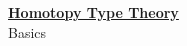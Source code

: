 \documentclass[hott-all.tex]{subfiles}
\begin{document}
\begin{center}
  {\Large{\underline{\textbf{Homotopy Type Theory}}}} \\[2mm]
  {\large Basics}
\end{center}

\setcounter{chapter}{2}

%
%
\end{document}
